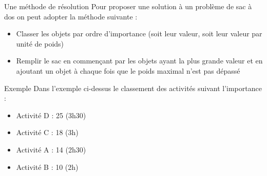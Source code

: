 \documentclass[10pt]{beamer}
\begin{document}
\begin{frame}
    \mframe{\AG}
    \begin{alertblock}{Une méthode de résolution}
        Pour proposer une solution à un problème de sac à dos on peut adopter la méthode suivante :
        \begin{itemize}[label=\textbullet]
            \item<2-> Classer les objets par ordre d'importance (soit leur valeur, soit leur valeur par unité de poids)
            \item<3-> Remplir le sac en commençant par les objets ayant la plus grande valeur et en ajoutant un objet à chaque fois que le poids maximal n'est pas dépassé
        \end{itemize}
    \end{alertblock}
\end{frame}

%
\begin{frame}
    \mframe{\AG}
    \begin{exampleblock}{Exemple}
        Dans l'exemple ci-dessus le classement des activités suivant l'importance :
        \begin{itemize}[label=\textbullet]
            \item<5-> Activité D : 25 (3h30)
            \item<6-> Activité C : 18 (3h)
            \item<7-> Activité A : 14 (2h30)
            \item<8-> Activité B : 10 (2h)
        \end{itemize}
        \\
    \end{exampleblock}
\end{frame}
\end{document}
